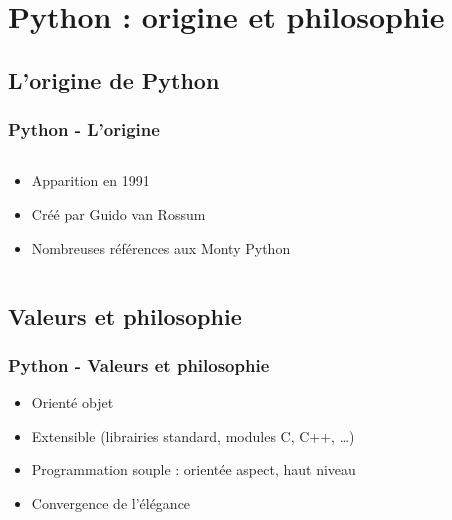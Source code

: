 \section{Python : origine et philosophie}
\subsection{L'origine de Python}
\begin{frame}
  \frametitle{Python - L'origine}
  \begin{columns}
    \begin{column}{5cm}
      \begin{itemize}
        \item<1-> Apparition en 1991
        \item<2-> Créé par Guido van Rossum
        \item<3-> Nombreuses références aux Monty Python
      \end{itemize}
    \end{column}
  \end{columns}
\end{frame}

\subsection{Valeurs et philosophie}
\begin{frame}
\frametitle{Python - Valeurs et philosophie}
  \begin{itemize}
    \item<1-> Orienté objet
    \item<2-> Extensible (librairies standard, modules C, C++, \ldots)
    \item<3-> Programmation souple : orientée aspect, haut niveau
    \item<4-> Convergence de l'élégance
  \end{itemize}
\end{frame}


